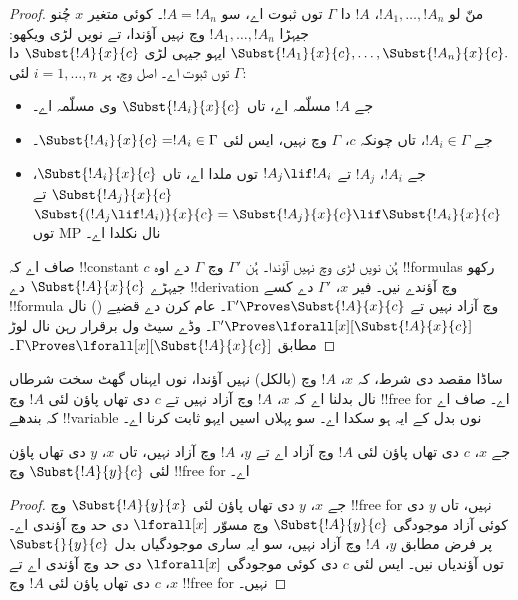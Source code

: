\documentclass[../../../include/open-logic-section]{subfiles}
\begin{document}
\begin{proof} منّ لو $!A_1,\ldots,!A_n$، $!A$ دا $\Gamma$ توں ثبوت اے، سو $!A=!A_n$۔ کوئی متغیر $x$ چُنو جیہڑا $!A_1,\ldots,!A_n$ وچ نہیں آؤندا، تے نویں لڑی ویکھو: $\Subst{!A_1}{x}{c},\ldots,\Subst{!A_n}{x}{c}.$ ایہو جیہی لڑی $\Subst{!A}{x}{c}$ دا $\Gamma$ توں ثبوت اے۔ اصل وچ، ہر $i=1,\ldots,n$ لئی:
\begin{itemize} \item جے $!A$ مسلّمہ اے، تاں $\Subst{!A_i}{x}{c}$ وی مسلّمہ اے۔
\item جے $!A_i \in \Gamma$، تاں چونکہ $c$، $\Gamma$ وچ نہیں، ایس لئی $\Subst{!A_i}{x}{c} = !A_i \in \Gamma$۔
\item جے $!A_i$، $!A_j$ تے $!A_j \lif !A_i$ توں ملدا اے، تاں $\Subst{!A_i}{x}{c}$، $\Subst{!A_j}{x}{c}$ تے $\Subst{(!A_j \lif !A_i)}{x}{c}
= \Subst{!A_j}{x}{c} \lif \Subst{!A_i}{x}{c}$ توں MP نال نکلدا اے۔
\end{itemize} صاف اے کہ !!{constant} $c$ ہُن نویں لڑی وچ نہیں آؤندا۔ ہُن $\Gamma'$ وچ $\Gamma$ دے اوہ !!{formula}s رکھو جیہڑے $\Subst{!A}{x}{c}$ دے !!{derivation} وچ آؤندے نیں۔ فیر $x$، $\Gamma'$ دے کسے !!{formula} وچ آزاد نہیں تے $\Gamma' \Proves \Subst{!A}{x}{c}$۔
عام کرن دے قضیے () نال $\Gamma'
\Proves \lforall[x][\Subst{!A}{x}{c}]$۔ وڈے سیٹ ول برقرار رہن نال لوڑ مطابق $\Gamma \Proves
\lforall[x][\Subst{!A}{x}{c}]$۔
\end{proof}

\begin{explain}
ساڈا مقصد  دی شرط، کہ $x$، $!A$ وچ (بالکل) نہیں آؤندا، نوں ایہناں گھٹ سخت شرطاں نال بدلنا اے کہ $x$، $!A$ وچ آزاد نہیں تے $c$ دی تھاں پاؤن لئی $!A$ وچ !!{free for} اے۔ صاف اے کہ بندھے !!{variable} نوں بدل کے ایہ ہو سکدا اے۔ سو پہلاں اسیں ایہو ثابت کرنا اے۔
\end{explain}

\begin{lem}
جے $x$، $c$ دی تھاں پاؤن لئی $!A$ وچ آزاد اے تے $y$، $!A$ وچ آزاد نہیں، تاں $x$، $y$ دی تھاں پاؤن لئی $\Subst{!A}{y}{c}$ وچ !!{free for} اے۔
\end{lem}

\begin{proof} جے $x$، $y$ دی تھاں پاؤن لئی $\Subst{!A}{y}{x}$ وچ !!{free for} نہیں، تاں $y$ دی کوئی آزاد موجودگی $\Subst{!A}{y}{c}$ وچ مسوّر $\lforall[x]$ دی حد وچ آؤندی اے۔ پر فرض مطابق $y$، $!A$ وچ آزاد نہیں، سو ایہ ساری موجودگیاں بدل $\Subst{}{y}{c}$ توں آؤندیاں نیں۔ ایس لئی $c$ دی کوئی موجودگی $\lforall[x]$ دی حد وچ آؤندی اے تے $x$، $c$ دی تھاں پاؤن لئی $!A$ وچ !!{free for} نہیں۔
\end{proof}
\end{document}
